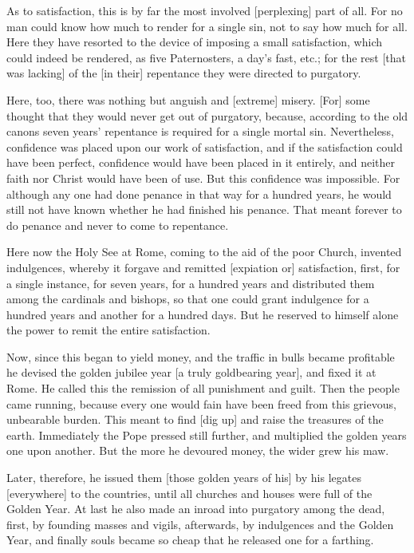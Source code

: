As to satisfaction, this is by far the most involved
[perplexing] part of all. For no man could know how much to
render for a single sin, not to say how much for all. Here
they have resorted to the device of imposing a small
satisfaction, which could indeed be rendered, as five
Paternosters, a day's fast, etc.; for the rest [that was
lacking] of the [in their] repentance they were directed to
purgatory.

Here, too, there was nothing but anguish and [extreme] misery.
[For] some thought that they would never get out of purgatory,
because, according to the old canons seven years' repentance
is required for a single mortal sin. Nevertheless, confidence
was placed upon our work of satisfaction, and if the
satisfaction could have been perfect, confidence would have
been placed in it entirely, and neither faith nor Christ would
have been of use. But this confidence was impossible. For
although any one had done penance in that way for a hundred
years, he would still not have known whether he had finished
his penance. That meant forever to do penance and never to
come to repentance.

Here now the Holy See at Rome, coming to the aid of the poor
Church, invented indulgences, whereby it forgave and remitted
[expiation or] satisfaction, first, for a single instance, for
seven years, for a hundred years and distributed them among
the cardinals and bishops, so that one could grant indulgence
for a hundred years and another for a hundred days. But he
reserved to himself alone the power to remit the entire
satisfaction.

Now, since this began to yield money, and the traffic in bulls
became profitable he devised the golden jubilee year [a truly
goldbearing year], and fixed it at Rome. He called this the
remission of all punishment and guilt. Then the people came
running, because every one would fain have been freed from
this grievous, unbearable burden. This meant to find [dig up]
and raise the treasures of the earth. Immediately the Pope
pressed still further, and multiplied the golden years one
upon another. But the more he devoured money, the wider grew
his maw.

Later, therefore, he issued them [those golden years of his]
by his legates [everywhere] to the countries, until all
churches and houses were full of the Golden Year. At last he
also made an inroad into purgatory among the dead, first, by
founding masses and vigils, afterwards, by indulgences and the
Golden Year, and finally souls became so cheap that he
released one for a farthing.

